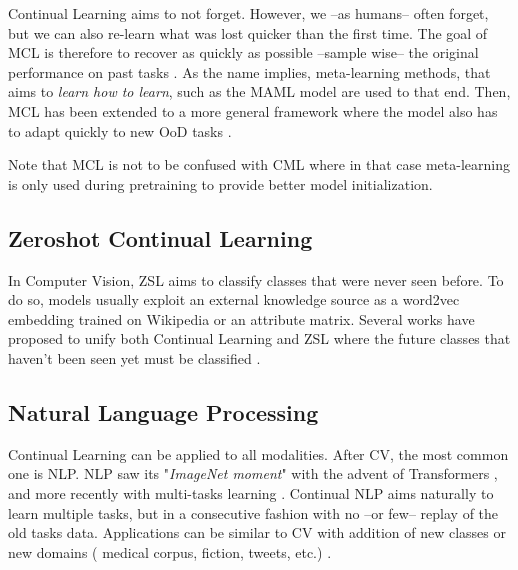 Continual Learning aims to not forget. However, we --as humans-- often forget, but we can also
re-learn what was lost quicker than the first time. The goal of \ac{MCL} is therefore to recover as
quickly as possible --sample wise-- the original performance on past tasks
\citep{he2019metacontinual}. As the name implies, meta-learning methods, that aims to \textit{learn
    how to learn}, such as the MAML model \citep{finn2017maml} are used to that end. Then, \ac{MCL} has
been extended to a more general framework where the model also has to adapt quickly to new \acf{OoD}
tasks \citep{caccia2020osaka}.

Note that \acf{MCL} is not to be confused with \acf{CML} where in that case meta-learning is only
used during pretraining to provide better model initialization.

\subsection{Zeroshot Continual Learning}
\label{sec:related_zeroshot}


In Computer Vision, \acf{ZSL} \citep{lampert2009zeroshot,xian2019awa2} aims to classify classes that
were never seen before. To do so, models usually exploit an external knowledge source as a word2vec
embedding \citep{mikolov2013word2vec} trained on Wikipedia or an attribute matrix. Several works
have proposed to unify both Continual Learning and \ac{ZSL} where the future classes that haven't
been seen yet must be classified
\citep{lopezpaz2017gem,wei2020lifelongzeroshot,gautam2020continualzeroshot}.

\subsection{Natural Language Processing}
\label{sec:related_nlp}


Continual Learning can be applied to all modalities. After \acf{CV}, the most common one is
\ac{NLP}. \ac{NLP} saw its "\textit{ImageNet moment}" with the advent of Transformers
\citep{vaswani2017transformer}, and more recently with multi-tasks learning \citep{raffel2019t5}.
Continual \ac{NLP} \citet{biesialska2020continualnlp} aims naturally to learn multiple tasks, but in
a consecutive fashion with no --or few-- replay of the old tasks data. Applications can be similar
to \ac{CV} with addition of new classes \citep{masson2019episodiclifelongnlp} or new domains (\eg
medical corpus, fiction, tweets, etc.) \citep{gerald2021continualri}.

